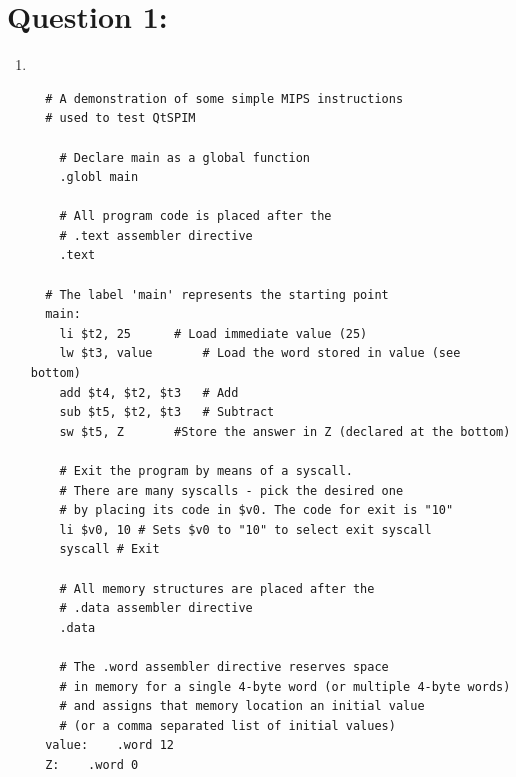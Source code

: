 \documentclass[12pt,a4paper]{article}
\begin{document}
\begin{titlepage}
\begin{center}
\begin{minipage}{0.4\textwidth}
\begin{flushright}
      \end{flushright}
    \end{minipage}

    \vfill

    \vspace{2cm}
    {\large} %
  \end{center}
\end{titlepage}


\section*{Question 1:}
\begin{enumerate}[label=\alph*.]
  \item\mbox{}\\
        \begin{mdframed}[hidealllines=true,backgroundcolor=magenta!10]
          \begin{lstlisting}
  # A demonstration of some simple MIPS instructions
  # used to test QtSPIM

    # Declare main as a global function
    .globl main

    # All program code is placed after the
    # .text assembler directive
    .text

  # The label 'main' represents the starting point
  main:
    li $t2, 25		# Load immediate value (25)
    lw $t3, value		# Load the word stored in value (see bottom)
    add $t4, $t2, $t3	# Add
    sub $t5, $t2, $t3	# Subtract
    sw $t5, Z		#Store the answer in Z (declared at the bottom)

    # Exit the program by means of a syscall.
    # There are many syscalls - pick the desired one
    # by placing its code in $v0. The code for exit is "10"
    li $v0, 10 # Sets $v0 to "10" to select exit syscall
    syscall # Exit

    # All memory structures are placed after the
    # .data assembler directive
    .data

    # The .word assembler directive reserves space
    # in memory for a single 4-byte word (or multiple 4-byte words)
    # and assigns that memory location an initial value
    # (or a comma separated list of initial values)
  value:	.word 12
  Z:	.word 0
          \end{lstlisting}
        \end{mdframed}
\end{enumerate}
\end{document}
